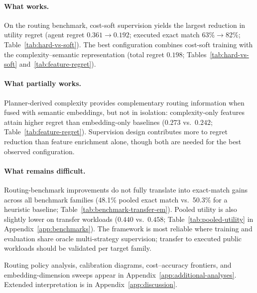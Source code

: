 \paragraph{What works.}
On the routing benchmark, cost-soft supervision yields the largest reduction in utility regret
(agent regret $0.361\to 0.192$; executed exact match 63\%$\to$82\%; Table~\ref{tab:hard-vs-soft}).
The best configuration combines cost-soft training with the complexity--semantic representation
(total regret $0.198$; Tables~\ref{tab:hard-vs-soft} and~\ref{tab:feature-regret}).

\paragraph{What partially works.}
Planner-derived complexity provides complementary routing information when fused with semantic
embeddings, but not in isolation: complexity-only features attain higher regret than
embedding-only baselines ($0.273$ vs.\ $0.242$; Table~\ref{tab:feature-regret}).
Supervision design contributes more to regret reduction than feature enrichment alone, though
both are needed for the best observed configuration.

\paragraph{What remains difficult.}
Routing-benchmark improvements do not fully translate into exact-match gains across all
benchmark families (48.1\% pooled exact match vs.\ 50.3\% for a heuristic baseline;
Table~\ref{tab:benchmark-transfer-em}).
Pooled utility is also slightly lower on transfer workloads ($0.440$ vs.\ $0.458$;
Table~\ref{tab:pooled-utility} in Appendix~\ref{app:benchmarks}).
The framework is most reliable where training and evaluation share oracle multi-strategy
supervision; transfer to executed public workloads should be validated per target family.

Routing policy analysis, calibration diagrams, cost--accuracy frontiers, and embedding-dimension
sweeps appear in Appendix~\ref{app:additional-analyses}.
Extended interpretation is in Appendix~\ref{app:discussion}.
